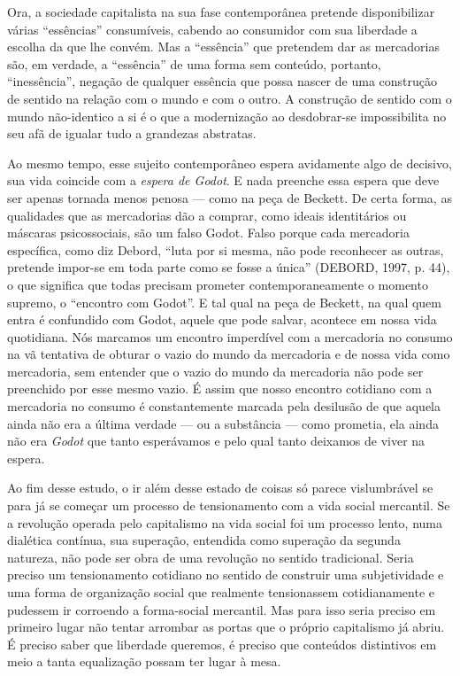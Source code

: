 Ora, a sociedade capitalista na sua fase contemporânea pretende
disponibilizar várias ``essências'' consumíveis, cabendo ao consumidor
com sua liberdade a escolha da que lhe convém. Mas a ``essência'' que
pretendem dar as mercadorias são, em verdade, a ``essência'' de uma
forma sem conteúdo, portanto, ``inessência'', negação de qualquer
essência que possa nascer de uma construção de sentido na relação com o
mundo e com o outro. A construção de sentido com o mundo não-identico a
si é o que a modernização ao desdobrar-se impossibilita no seu afã de
igualar tudo a grandezas abstratas.

Ao mesmo tempo, esse sujeito contemporâneo espera avidamente algo de
decisivo, sua vida coincide com a \emph{espera de Godot}. E nada
preenche essa espera que deve ser apenas tornada menos penosa --- como
na peça de Beckett. De certa forma, as qualidades que as mercadorias dão
a comprar, como ideais identitários ou máscaras psicossociais, são um
falso Godot. Falso porque cada mercadoria específica, como diz Debord,
``luta por si mesma, não pode reconhecer as outras, pretende impor-se em
toda parte como se fosse a única'' (DEBORD, 1997, p. 44), o que
significa que todas precisam prometer contemporaneamente o momento
supremo, o ``encontro com Godot''. E tal qual na peça de Beckett, na
qual quem entra é confundido com Godot, aquele que pode salvar, acontece
em nossa vida quotidiana. Nós marcamos um encontro imperdível com a
mercadoria no consumo na vã tentativa de obturar o vazio do mundo da
mercadoria e de nossa vida como mercadoria, sem entender que o vazio do
mundo da mercadoria não pode ser preenchido por esse mesmo vazio. É
assim que nosso encontro cotidiano com a mercadoria no consumo é
constantemente marcada pela desilusão de que aquela ainda não era a
última verdade --- ou a substância --- como prometia, ela ainda não era
\emph{Godot} que tanto esperávamos e pelo qual tanto deixamos de viver
na espera.

Ao fim desse estudo, o ir além desse estado de coisas só parece
vislumbrável se para já se começar um processo de tensionamento com a
vida social mercantil. Se a revolução operada pelo capitalismo na vida
social foi um processo lento, numa dialética contínua, sua superação,
entendida como superação da segunda natureza, não pode ser obra de uma
revolução no sentido tradicional. Seria preciso um tensionamento
cotidiano no sentido de construir uma subjetividade e uma forma de
organização social que realmente tensionassem cotidianamente e pudessem
ir corroendo a forma-social mercantil. Mas para isso seria preciso em
primeiro lugar não tentar arrombar as portas que o próprio capitalismo
já abriu. É preciso saber que liberdade queremos, é preciso que
conteúdos distintivos em meio a tanta equalização possam ter lugar à
mesa.

